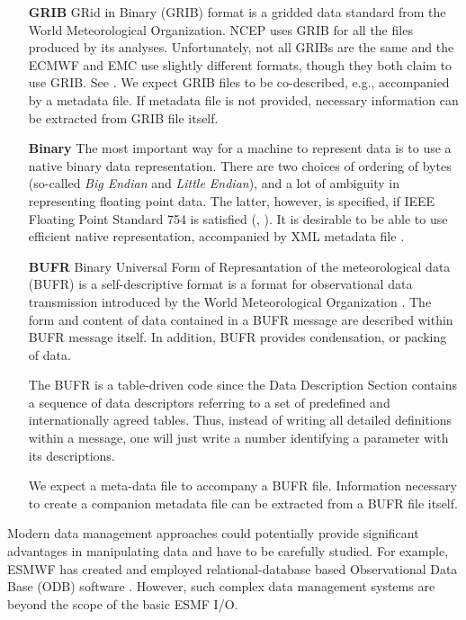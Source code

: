 \begin{itemize}
\item[\bf GRIB] GRid in Binary (GRIB) format is a gridded data
standard from the World Meteorological Organization. NCEP uses GRIB
for all the files produced by its analyses. Unfortunately, not all
GRIBs are the same and the ECMWF and EMC use slightly different
formats, though they both claim to use GRIB. See \cite{GRIB_1}.
We expect GRIB files to be co-described, e.g., accompanied by a metadata file.
If metadata file is not provided, necessary information can be extracted from 
GRIB file itself.

\item[\bf Binary]
The most important way for a machine to represent data is to use a
native binary data representation. There are  two choices of ordering of 
bytes (so-called {\it Big Endian} and {\it Little Endian}), and a lot of
ambiguity in representing floating point data. The latter, however, is
specified, if IEEE Floating Point Standard 754 is satisfied 
(\cite{IEEE-Floating-Point}, \cite{Kahan-IEEE-754}). It is
desirable to be able to use efficient native representation,
accompanied by XML metadata file \cite{XML-W3C}. 

\item[\bf BUFR] Binary Universal Form of Represantation of the meteorological 
data (BUFR) is a self-descriptive format is a format for observational data 
transmission introduced by the World Meteorological Organization 
\cite{WMO-BUFR-CREX}. The form and content of data contained in a BUFR 
message are described within BUFR message itself. In addition, BUFR provides 
condensation, or packing of data. 

The BUFR is a table-driven code since the Data Description Section
contains a sequence of data descriptors referring to a set of predefined and 
internationally agreed tables. Thus, instead of writing all detailed
definitions within a message, one will just write a number identifying
a parameter with its descriptions.

We expect a meta-data file to accompany a BUFR file. Information necessary 
to create a companion metadata file can be extracted from a BUFR file itself. 
\end{itemize}

Modern data management approaches could potentially provide significant 
advantages in manipulating data and have to be carefully studied.
For example, ESMWF has created and employed relational-database based 
Observational Data Base (ODB) software \cite{ODB}.  However, such complex 
data management systems are beyond the scope of the basic ESMF I/O. 



